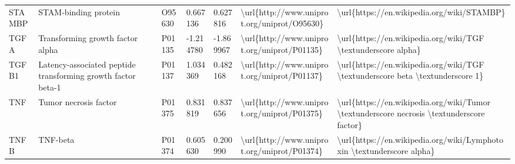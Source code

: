 \begin{table}[]
\begin{tabular}{lllllll}
\multicolumn{1}{l|}{STAMBP}   & STAM-binding protein                                          & O95630  & 0.667136           & 0.627816          & \textbackslash{}url\{http://www.uniprot.org/uniprot/O95630\} & \textbackslash{}url\{https://en.wikipedia.org/wiki/STAMBP\}                                                                                                                                                                                                                                        \\
\multicolumn{1}{l|}{TGFA}     & Transforming growth factor alpha                              & P01135  & -1.214780          & -1.869967         & \textbackslash{}url\{http://www.uniprot.org/uniprot/P01135\} & \textbackslash{}url\{https://en.wikipedia.org/wiki/TGF \textbackslash{}textunderscore alpha\}                                                                                                                                                                                                      \\
\multicolumn{1}{l|}{TGFB1}    & Latency-associated peptide transforming growth factor beta-1  & P01137  & 1.034369           & 0.482168          & \textbackslash{}url\{http://www.uniprot.org/uniprot/P01137\} & \textbackslash{}url\{https://en.wikipedia.org/wiki/TGF \textbackslash{}textunderscore beta \textbackslash{}textunderscore 1\}                                                                                                                                                                      \\
\multicolumn{1}{l|}{TNF}      & Tumor necrosis factor                                         & P01375  & 0.831819           & 0.837656          & \textbackslash{}url\{http://www.uniprot.org/uniprot/P01375\} & \textbackslash{}url\{https://en.wikipedia.org/wiki/Tumor \textbackslash{}textunderscore necrosis \textbackslash{}textunderscore factor\}                                                                                                                                                           \\
\multicolumn{1}{l|}{TNFB}     & TNF-beta                                                      & P01374  & 0.605630           & 0.200990          & \textbackslash{}url\{http://www.uniprot.org/uniprot/P01374\} & \textbackslash{}url\{https://en.wikipedia.org/wiki/Lymphotoxin \textbackslash{}textunderscore alpha\}                                                                                                                                                                                              \\

\end{tabular}
\end{table}
